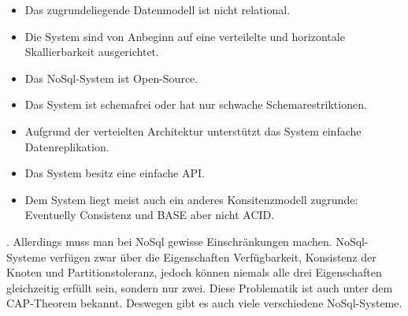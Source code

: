 \begin{itemize}
    \item Das zugrundeliegende Datenmodell ist nicht relational.
    \item Die System sind von Anbeginn auf eine verteilelte und horizontale
        Skallierbarkeit ausgerichtet.
    \item Das NoSql-System ist Open-Source.
    \item Das System ist schemafrei oder hat nur schwache Schemarestriktionen.
    \item Aufgrund der verteielten Architektur unterstützt das System einfache
        Datenreplikation.
    \item Das System besitz eine einfache \gls{API}.
    \item Dem System liegt meist auch ein anderes Konsitenzmodell zugrunde:
        Eventuelly Consistenz und \gls{BASE} aber nicht \gls{ACID}.
\end{itemize}

. Allerdings muss man bei NoSql gewisse Einschränkungen machen. NoSql-Systeme
verfügen zwar über die Eigenschaften Verfügbarkeit, Konsistenz der Knoten und
Partitionstoleranz, jedoch können niemals alle drei Eigenschaften gleichzeitig
erfüllt sein, sondern nur zwei. Diese Problematik ist auch unter
dem \gls{CAP}-Theorem bekannt. Deswegen gibt es auch viele verschiedene
NoSql-Systeme.

